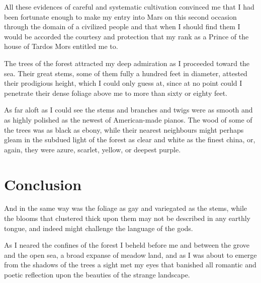 \documentclass[11pt,a4paper,twocolumn]{article}
\begin{document}
All these evidences of careful and systematic cultivation convinced me
that I had been fortunate enough to make my entry into Mars on this
second occasion through the domain of a civilized people and that when
I should find them I would be accorded the courtesy and protection that
my rank as a Prince of the house of Tardos Mors entitled me to.

The trees of the forest attracted my deep admiration as I proceeded
toward the sea.  Their great stems, some of them fully a hundred feet
in diameter, attested their prodigious height, which I could only guess
at, since at no point could I penetrate their dense foliage above me to
more than sixty or eighty feet.

As far aloft as I could see the stems and branches and twigs were as
smooth and as highly polished as the newest of American-made pianos.
The wood of some of the trees was as black as ebony, while their
nearest neighbours might perhaps gleam in the subdued light of the
forest as clear and white as the finest china, or, again, they were
azure, scarlet, yellow, or deepest purple.

\section{Conclusion}

And in the same way was the foliage as gay and variegated as the stems,
while the blooms that clustered thick upon them may not be described in
any earthly tongue, and indeed might challenge the language of the gods.

As I neared the confines of the forest I beheld before me and between
the grove and the open sea, a broad expanse of meadow land, and as I
was about to emerge from the shadows of the trees a sight met my eyes
that banished all romantic and poetic reflection upon the beauties of
the strange landscape.



\end{document}
